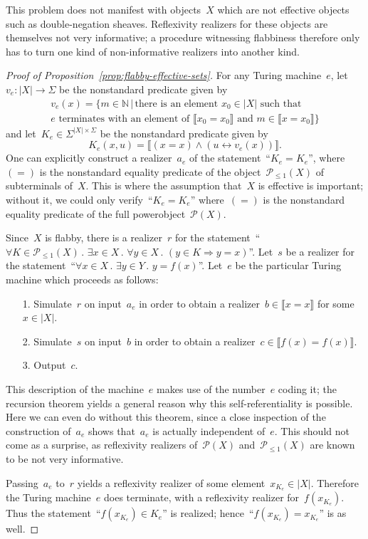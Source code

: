 \documentclass[oneside]{amsart}
\theoremstyle{definition}
\theoremstyle{plain}
\theoremstyle{remark}
\newcommand{\NN}{\mathbb{N}}
\renewcommand{\P}{\mathcal{P}}
\renewcommand{\_}{\mathpunct{.}\,}
\newcommand{\effective}{ef{}fective\xspace}
\begin{document}
This problem does not manifest with objects~$X$ which are not \effective
objects such as double-negation sheaves.
Reflexivity realizers for these objects are themselves not very informative;
a procedure witnessing flabbiness therefore only has to turn one kind of
non-informative realizers into another kind.

\begin{proof}[Proof of Proposition~\ref{prop:flabby-effective-sets}]
For any Turing machine~$e$, let~$v_e : |X| \to \Sigma$ be the nonstandard
predicate given by
\begin{multline*}
  v_e(x) = \{ m \in \NN \,|\,
  \text{there is an element~$x_0 \in |X|$ such that} \\
  \text{$e$ terminates with an element of~$\llbracket x_0 = x_0 \rrbracket$ and
  $m \in \llbracket x = x_0 \rrbracket$} \}
\end{multline*}
and let~$K_e \in \Sigma^{|X| \times \Sigma}$ be the nonstandard predicate given by
\[ K_e(x,u) = \llbracket (x = x) \wedge (u \leftrightarrow v_e(x)) \rrbracket. \]
One can explicitly construct a realizer~$a_e$ of the statement~``$K_e = K_e$'',
where~$({=})$ is the nonstandard equality predicate of the object~$\P_{\leq1}(X)$
of subterminals of~$X$. This is where the assumption that~$X$ is \effective is
important; without it, we could only verify~``$K_e = K_e$'' where~$({=})$ is
the nonstandard equality predicate of the full powerobject~$\P(X)$.

Since~$X$ is flabby, there is a realizer~$r$ for the statement~``$\forall K \in
\P_{\leq1}(X)\_ \exists x \in X\_ \forall y \in X\_ (y \in K \Rightarrow y =
x)$''. Let~$s$ be a realizer for the statement~``$\forall x \in X\_ \exists y
\in Y\_ y = f(x)$''. Let~$e$ be the particular Turing machine which proceeds as
follows:
\begin{enumerate}
\item[1.] Simulate~$r$ on input~$a_e$ in order to obtain a realizer~$b \in
\llbracket x = x \rrbracket$ for some~$x \in |X|$.
\item[2.] Simulate~$s$ on input~$b$ in order to obtain a realizer~$c \in \llbracket
f(x) = f(x) \rrbracket$.
\item[3.] Output~$c$.
\end{enumerate}
This description of the machine~$e$ makes use of the number~$e$ coding it;
the recursion theorem yields a general reason why this self-referentiality is
possible. Here we can even do without this theorem, since a close inspection of
the construction of~$a_e$ shows that~$a_e$ is actually independent of~$e$. This
should not come as a surprise, as reflexivity realizers of~$\P(X)$
and~$\P_{\leq1}(X)$ are known to be not very informative.

Passing~$a_e$ to~$r$ yields a reflexivity realizer of some element~$x_{K_e} \in
|X|$. Therefore the Turing machine~$e$ does terminate, with a reflexivity
realizer for~$f(x_{K_e})$. Thus the statement~``$f(x_{K_e}) \in K_e$'' is
realized; hence~``$f(x_{K_e}) = x_{K_e}$'' is as well.
\end{proof}
\end{document}
